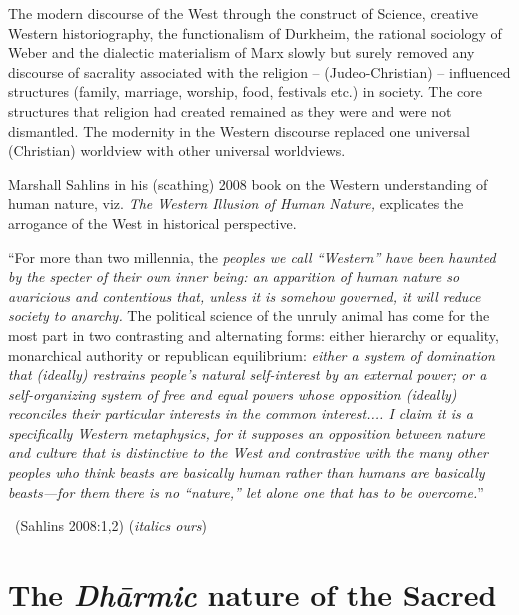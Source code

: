The modern discourse of the West through the construct of Science, creative Western historiography, the functionalism of Durkheim, the rational sociology of Weber and the dialectic materialism of Marx slowly but surely removed any discourse of sacrality associated with the religion – (Judeo-Christian) – influenced structures (family, marriage, worship, food, festivals etc.) in society. The core structures that religion had created remained as they were and were not dismantled. The modernity in the Western discourse replaced one universal (Christian) worldview with other universal worldviews.

Marshall Sahlins in his (scathing) 2008 book on the Western understanding of human nature, viz. \textit{The Western Illusion of Human Nature,} explicates the arrogance of the West in historical perspective.

\begin{myquote}
“For more than two millennia, the \textit{peoples we call “Western” have been haunted by the specter of their own inner being: an apparition of human nature so avaricious and contentious that, unless it is somehow governed, it will reduce society to anarchy.} The political science of the unruly animal has come for the most part in two contrasting and alternating forms: either hierarchy or equality, monarchical authority or republican equilibrium: \textit{either a system of domination that (ideally) restrains people's natural self-interest by an external power; or a self-organizing system of free and equal powers whose opposition (ideally) reconciles their particular interests in the common interest.... I claim it is a specifically Western metaphysics, for it supposes an opposition between nature and culture that is distinctive to the West and contrastive with the many other peoples who think beasts are basically human rather than humans are basically beasts—for them there is no “nature,” let alone one that has to be overcome.}” 

\vskip -5pt

~\hfill (Sahlins 2008:1,2) (\textit{italics ours})
\end{myquote}

\vspace{-.5cm}

\section*{The \textit{Dhārmic} nature of the Sacred}

